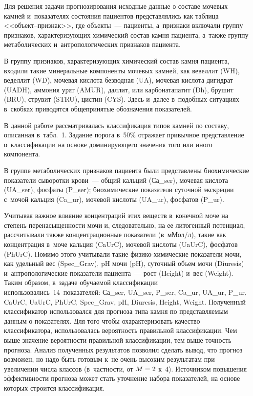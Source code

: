 \begin{multicols}{2}
     Для решения задачи прогнозирования исходные данные о составе 
мочевых камней и~показателях состояния пациентов представлялись как  
таб\-ли\-ца <<объ\-ект--приз\-нак>>, где объекты~--- пациенты, а~признаки 
включали группу признаков, характеризу\-ющих химический состав камня 
пациента, а~также группу метаболических и~антропологических признаков 
пациента.
     
     В группу признаков, характеризующих хими\-ческий состав камня 
пациента, входили такие минеральные компоненты мочевых камней, как 
вевеллит (WH), веделлит (WD), мочевая кислота безвод\-ная (UA), мочевая 
кислота дигидрат (UADH), аммония урат (AMUR), даллит, или карбонатапатит 
(Dh), брушит (BRU), струвит (STRU), цистин (CYS). Здесь и~далее в~подобных 
ситуациях в~скобках приводятся общепринятые обозначения показателей.
     
     В данной работе рассматривалась классификация типов камней по 
составу, описанная в~табл.~1. Задание порога в~50\% отражает привычное 
пред\-став\-ле\-ние о~классификации на основе домини\-ру\-юще\-го значения того или 
иного компонента. 
     

     
     В группе метаболических признаков пациента были представлены 
биохимические показатели сыворотки крови~--- общий кальций (Са\_ser), 
мочевая кислота (UA\_ser), фосфаты (P\_ser); биохимические показатели 
суточной экскреции с~мочой кальция (Ca\_ur), мочевой кислоты (UA\_ur), 
фосфатов (P\_ur).
     
     Учитывая важное влияние концентраций этих веществ в~конечной моче 
на степень перена\-сы\-щенности мочи и, следовательно, на ее литогенный\linebreak 
потенциал, рассчитывали также концентрационные показатели (в~мМол/л), 
такие как концентрация в~моче кальция (CaUrC), мочевой кислоты (\mbox{UaUrC}), 
фосфатов (PhUrC). Помимо этого учитывали такие физико-химические 
показатели мочи, как удельный вес (Spec\_Grav), pH мочи (pH), суточный объем 
мочи (Diuresis) и~антропологические показатели пациента~--- рост (Height) 
и~вес (Weight). Таким образом, в~задаче обучаемой классификации 
использовались~14~показателей: Са\_ser, UA\_ser, P\_ser, Ca\_ur, UA\_ur, P\_ur, 
CaUrC, UaUrC, PhUrC, Spec\_Grav, pH, Diuresis, Height, Weight. Полученный 
классификатор использовался для прогноза типа камня по представляемым 
данным о показателях. Для того чтобы охарактеризовать качество 
классификатора, использовалась вероятность правильной классификации. Чем 
выше значение вероятности правильной классификации, тем выше точность 
прогноза. Анализ полученных результатов позволил сделать вывод, что прогноз 
возможен, но надо быть готовым к~не очень высоким результатам при 
увеличении числа классов (в~част\-ности, от $M\hm=2$ к~4). 
Источником повышения эффективности прогноза может стать уточнение 
набора показателей, на основе которых строится классификация. 
     

\end{multicols}

